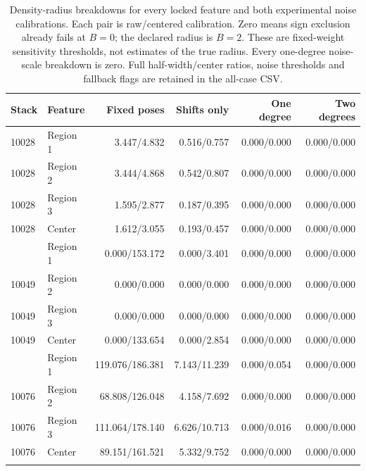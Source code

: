 \begin{table}[p]
\centering\small
\caption{Density-radius breakdowns for every locked feature and both experimental noise calibrations. Each pair is raw/centered calibration. Zero means sign exclusion already fails at $B=0$; the declared radius is $B=2$. These are fixed-weight sensitivity thresholds, not estimates of the true radius. Every one-degree noise-scale breakdown is zero. Full half-width/center ratios, noise thresholds and fallback flags are retained in the all-case CSV.}
\begin{tabular}{llrrrr}
\toprule
Stack & Feature & Fixed poses & Shifts only & One degree & Two degrees \\
\midrule
10028 & Region 1 & 3.447/4.832 & 0.516/0.757 & 0.000/0.000 & 0.000/0.000 \\
10028 & Region 2 & 3.444/4.868 & 0.542/0.807 & 0.000/0.000 & 0.000/0.000 \\
10028 & Region 3 & 1.595/2.877 & 0.187/0.395 & 0.000/0.000 & 0.000/0.000 \\
10028 & Center & 1.612/3.055 & 0.193/0.457 & 0.000/0.000 & 0.000/0.000 \\
\addlinespace
10049 & Region 1 & 0.000/153.172 & 0.000/3.401 & 0.000/0.000 & 0.000/0.000 \\
10049 & Region 2 & 0.000/0.000 & 0.000/0.000 & 0.000/0.000 & 0.000/0.000 \\
10049 & Region 3 & 0.000/0.000 & 0.000/0.000 & 0.000/0.000 & 0.000/0.000 \\
10049 & Center & 0.000/133.654 & 0.000/2.854 & 0.000/0.000 & 0.000/0.000 \\
\addlinespace
10076 & Region 1 & 119.076/186.381 & 7.143/11.239 & 0.000/0.054 & 0.000/0.000 \\
10076 & Region 2 & 68.808/126.048 & 4.158/7.692 & 0.000/0.000 & 0.000/0.000 \\
10076 & Region 3 & 111.064/178.140 & 6.626/10.713 & 0.000/0.016 & 0.000/0.000 \\
10076 & Center & 89.151/161.521 & 5.332/9.752 & 0.000/0.000 & 0.000/0.000 \\
\addlinespace
\bottomrule
\end{tabular}
\end{table}
